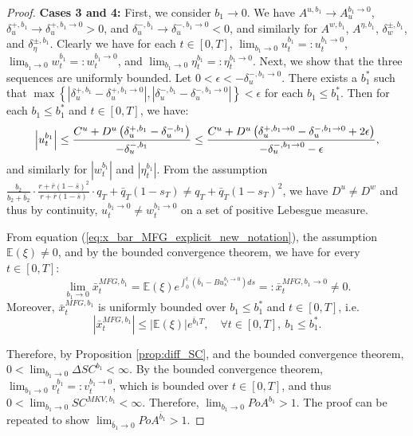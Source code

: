 \documentclass[11pt]{article}
\begin{document}
\begin{proof}
	\textbf{Cases 3 and 4:} First, we consider $b_1 \to 0$. We have $A^{u,b_1} \to A^{b_1\to 0}_u$, $\delta^{+,b_1}_u \to \delta^{+,b_1\to 0}_u>0$, and $\delta^{-,b_1}_u \to \delta^{-,b_1\to 0}_u<0$, and similarly for $A^{w,b_1}$, $A^{\eta,b_1}$, $\delta^{\pm,b_1}_w$, and $\delta^{\pm,b_1}_\eta$. Clearly we have for each $t\in[0,T]$, $\lim_{b_1 \to 0}u^{b_1}_t=:u^{b_1\to 0}_t$, $\lim_{b_1 \to 0}w^{b_1}_t=:w^{b_1 \to 0}_t$, and $\lim_{b_1 \to 0}\eta^{b_1}_t=:\eta^{b_1 \to 0}_t$. Next, we show that the three sequences are uniformly bounded. Let $0<\epsilon<-\delta^{-,b_1\to 0}_u$. There exists a $b_1^*$ such that $\max \left \{\left| \delta^{+,b_1}_u-\delta^{+,b_1\to0}_u \right|,\left| \delta^{-,b_1}_u-\delta^{-,b_1\to0}_u \right| \right\}<\epsilon$ for each $b_1 \leq b_1^*$. Then for each $b_1 \leq b_1^*$ and $t\in[0,T]$, we have:
	\begin{equation*}
	\left|u^{b_1}_t\right| \leq \frac{C^u+D^u\left(\delta^{+,b_1}_u-\delta^{-,b_1}_u\right) }{-\delta^{-,b_1}_u} \\
	\leq \frac{C^u+D^u\left(\delta^{+,b_1\to 0}_u-\delta^{-,b_1 \to 0}_u+2\epsilon\right) }{-\delta^{-,b_1\to 0}_u-\epsilon},
	\end{equation*}
	and similarly for $\left|w^{b_1}_t\right|$ and $\left|\eta^{b_1}_t\right|$. From the assumption $\frac{b_2}{b_2+\bar{b}_2}\cdot \frac{r + \bar{r}(1- \bar{s})^2}{r + \bar{r}(1-\bar{s})}\cdot q_T+\bar{q}_T(1-s_T) \neq q_T+\bar{q}_T(1-s_T)^2$, we have $D^{u} \neq D^{w}$ and thus by continuity, $u^{b_1\to 0}_t \neq w^{b_1\to 0}_t$ on a set of positive Lebesgue measure.
	
	From equation (\ref{eq:x_bar_MFG_explicit_new_notation}), the assumption $\mathbb{E}(\xi)\neq 0$, and by the bounded convergence theorem, we have for every $t \in [0,T]$:
	\begin{equation*}
	\lim_{b_1\to 0}\bar{x}_t^{MFG,b_1} = \mathbb{E}(\xi) e^{\int_0^t(\bar{b}_1-B u^{b_1\to 0}_s)ds} =: \bar{x}_t^{MFG,b_1\to 0}\neq 0.
	\end{equation*}
	Moreover, $\bar{x}_t^{MFG,b_1}$ is uniformly bounded over $b_1 \leq b_1^*$ and $t \in [0,T]$, i.e. 
	$$ \left\vert \bar{x}^{MFG,b_1}_t \right\vert \leq \left\vert \mathbb{E}(\xi) \right\vert e^{ \bar{b}_1 T }, \quad \forall t \in [0,T],\ b_1 \leq b_1^*. $$ 
	
	Therefore, by Proposition \ref{prop:diff_SC}, and the bounded convergence theorem, $0<\lim_{b_1 \to 0} \Delta SC^{b_1}<\infty$. By the bounded convergence theorem, $\lim_{b_1 \to 0}v^{b_1}_t=:v_t^{b_1 \to 0}$, which is bounded over $t\in [0,T]$, and thus $0<\lim_{b_1 \to 0} SC^{MKV,b_1}<\infty.$
	Therefore, $\lim_{b_1 \to 0} PoA^{b_1} > 1$. The proof can be repeated to show $\lim_{\bar{b}_1 \to 0} PoA^{\bar{b}_1}  > 1$.
\end{proof}
\end{document}
